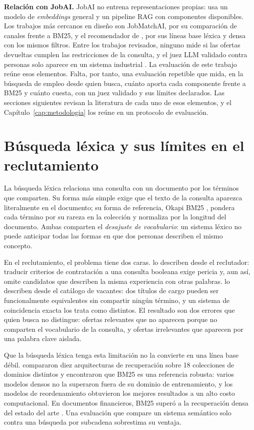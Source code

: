 \textbf{Relación con JobAI.} JobAI no entrena representaciones propias: usa un modelo de \textit{embeddings} general y un pipeline RAG con componentes disponibles. Los trabajos más cercanos en diseño son JobMatchAI, por su comparación de canales frente a BM25, y el recomendador de \citet{Hossain2026}, por sus líneas base léxica y densa con los mismos filtros. Entre los trabajos revisados, ninguno mide si las ofertas devueltas cumplen las restricciones de la consulta, y el juez LLM validado contra personas solo aparece en un sistema industrial \citep{Borisyuk2026}. La evaluación de este trabajo reúne esos elementos. Falta, por tanto, una evaluación repetible que mida, en la búsqueda de empleo desde quien busca, cuánto aporta cada componente frente a BM25 y cuánto cuesta, con un juez validado y sus límites declarados. Las secciones siguientes revisan la literatura de cada uno de esos elementos, y el Capítulo~\ref{cap:metodologia} los reúne en un protocolo de evaluación.

\section{Búsqueda léxica y sus límites en el reclutamiento}
\label{sec:estado-arte-keyword}

La búsqueda léxica relaciona una consulta con un documento por los términos que comparten. Su forma más simple exige que el texto de la consulta aparezca literalmente en el documento; su forma de referencia, Okapi BM25 \citep{Robertson2009}, pondera cada término por su rareza en la colección y normaliza por la longitud del documento. Ambas comparten el \emph{desajuste de vocabulario}: un sistema léxico no puede anticipar todas las formas en que dos personas describen el mismo concepto.

En el reclutamiento, el problema tiene dos caras. \citet{HaThuc2017} lo describen desde el reclutador: traducir criterios de contratación a una consulta booleana exige pericia y, aun así, omite candidatos que describen la misma experiencia con otras palabras. \citet{Bocharova2023} lo describen desde el catálogo de vacantes: dos títulos de cargo pueden ser funcionalmente equivalentes sin compartir ningún término, y un sistema de coincidencia exacta los trata como distintos. El resultado son dos errores que quien busca no distingue: ofertas relevantes que no aparecen porque no comparten el vocabulario de la consulta, y ofertas irrelevantes que aparecen por una palabra clave aislada.

Que la búsqueda léxica tenga esta limitación no la convierte en una línea base débil. \citet{Thakur2021} compararon diez arquitecturas de recuperación sobre 18 colecciones de dominios distintos y encontraron que BM25 es una referencia robusta: varios modelos densos no la superaron fuera de su dominio de entrenamiento, y los modelos de reordenamiento obtuvieron los mejores resultados a un alto costo computacional. En documentos financieros, BM25 superó a la recuperación densa del estado del arte \citep{Akarsu2026}. Una evaluación que compare un sistema semántico solo contra una búsqueda por subcadena sobrestima su ventaja.

